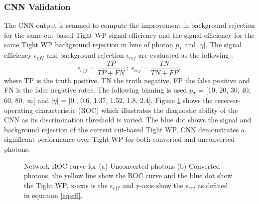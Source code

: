 \subsubsection{CNN Validation}
\label{gamma:CNN:Validation}
The CNN output is scanned to compute the improvement in background rejection for the same cut-based Tight WP signal efficiency and the signal efficiency for the same Tight WP background rejection in bins of photon $p_T$ and $|\eta|$. 
The signal efficiency $\epsilon_{eff}$ and background rejection $\epsilon_{rej}$ are evaluated as the following :
\begin{equation}
    \label{eq:eff}
    \epsilon_{eff} = \frac{TP}{TP+FN} \ ; \ \epsilon_{rej} = \frac{TN}{TN+FP} ,
\end{equation}
where TP is the truth positive, TN the truth negative, FP the false positive and FN is the false negative rates. The following binning is used $p_T$ = [10, 20, 30, 40, 60, 80, $\infty$] and $|\eta|$ = [0., 0.6, 1.37, 1.52, 1.8, 2.4].
Figure \ref{fig:gamma:CNN:Validation:ROC} shows the receiver-operating characteristic (ROC) which illustrates the diagnostic ability of the CNN as its discrimination threshold is varied. The blue dot shows the signal and background rejection of the current cut-based Tight WP, CNN demonstrates a significant performance over Tight WP for both converted and unconverted photons. 
\begin{figure}[ht]
    \centering
    \caption{Network ROC curve for (a) Unconverted photons (b) Converted photons, the yellow line show the ROC curve and the blue dot show the Tight WP, x-axis is the $\epsilon_{eff}$ and y-axis show the $\epsilon_{rej}$ as defined in equation \ref{eq:eff}.}
    \label{fig:gamma:CNN:Validation:ROC}
\end{figure}
